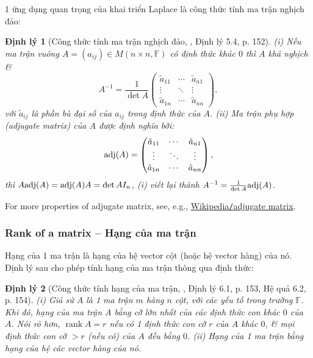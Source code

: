 \documentclass{article}
\newtheorem{dinhly}{Định lý}
\begin{document}
1 ứng dụng quan trọng của khai triển Laplace là công thức tính ma trận nghịch đảo:

\begin{dinhly}[Công thức tính ma trận nghịch đảo, \cite{Hung_linear_algebra}, Định lý 5.4, p. 152]
	(i) Nếu ma trận vuông $A = (a_{ij})\in M(n\times n,\mathbb{F})$ có định thức khác $0$ thì $A$ khả nghịch \&
	\begin{equation*}
		A^{-1} = \frac{1}{\det A}\begin{pmatrix}
			\tilde{a}_{11} & \cdots & \tilde{a}_{n1}\\\vdots & \ddots & \vdots\\\tilde{a}_{1n} & \cdots & \tilde{a}_{nn}
		\end{pmatrix},
	\end{equation*}
	với $\tilde{a}_{ij}$ là phần bù đại số của $a_{ij}$ trong định thức của $A$. (ii) {\rm Ma trận phụ hợp} (adjugate matrix) của $A$ được định nghĩa bởi:
	\begin{equation*}
		{\rm adj}(A) = \begin{pmatrix}
			\tilde{a}_{11} & \cdots & \tilde{a}_{n1}\\\vdots & \ddots & \vdots\\\tilde{a}_{1n} & \cdots & \tilde{a}_{nn}
		\end{pmatrix},
	\end{equation*}
	thì $A{\rm adj}(A) = {\rm adj}(A)A = \det A I_n$, (i) viết lại thành $A^{-1} = \frac{1}{\det A}{\rm adj}(A)$.
\end{dinhly}
For more properties of adjugate matrix, see, e.g., \href{https://en.wikipedia.org/wiki/Adjugate_matrix}{Wikipedia{\tt/}adjugate matrix}.

\subsubsection{Rank of a matrix -- Hạng của ma trận}
Hạng của 1 ma trận là hạng của hệ vector cột (hoặc hệ vector hàng) của nó. Định lý sau cho phép tính hạng của ma trận thông qua định thức:

\begin{dinhly}[Công thức tính hạng của ma trận, \cite{Hung_linear_algebra}, Định lý 6.1, p. 153, Hệ quả 6.2, p. 154]
	(i) Giả sử $A$ là 1 ma trận $m$ hàng $n$ cột, với các yếu tố trong trường $\mathbb{F}$. Khi đó, hạng của ma trận $A$ bằng cỡ lớn nhất của các định thức con khác $0$ của $A$. Nói rõ hơn, $\operatorname{rank}A = r$ nếu có 1 định thức con cỡ $r$ của $A$ khác $0$, \& mọi định thức con cỡ $> r$ (nếu có) của $A$ đều bằng $0$. (ii) Hạng của 1 ma trận bằng hạng của hệ các vector hàng của nó.
\end{dinhly}
\end{document}
